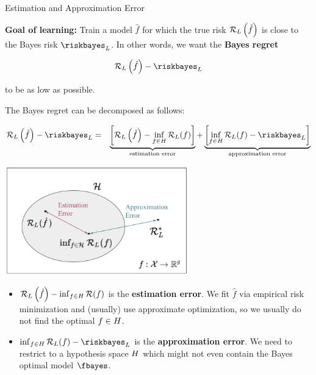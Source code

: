 \begin{vbframe}{Estimation and Approximation Error} 

\textbf{Goal of learning: } Train a model $\hat f$ for which the true risk $\mathcal{R}_L\left(\hat f\right)$ is close to the Bayes risk $\riskbayes_L$. In other words, we want the \textbf{Bayes regret}


$$
	\risk_L\left(\hat f\right) - \riskbayes_{L}
$$ 

to be as low as possible. 

\lz 

The Bayes regret can be decomposed as follows: 

\begin{eqnarray*}
	\risk_L\left(\hat f\right) - \riskbayes_{L} &=& \underbrace{\left[\risk_L\left(\hat f\right) - \inf_{f \in \Hspace} \risk_L(f)\right]}_{\text{estimation error}} + \underbrace{\left[\inf_{f \in \Hspace} \risk_L(f) - \riskbayes_{L}\right]}_{\text{approximation error}}
\end{eqnarray*}

\framebreak 


\begin{center}
\includegraphics[width=0.6\textwidth]{figure_man/risk_minimization_diagram.png}
\end{center}

\begin{itemize}
	\item $\mathcal{R}_L\left(\hat f\right) - \inf_{f \in H} \mathcal{R}(f)$ is the \textbf{estimation error}. We fit $\hat f$ via empirical risk minimization and (usually) use approximate optimization, so we usually do not find the optimal $f \in H$.
	\item $\inf_{f \in \Hspace} \risk_L(f) - \riskbayes_{L}$ is the \textbf{approximation error}. We need to restrict to a hypothesis space $H$ which might not even contain the Bayes optimal model $\fbayes$. 
\end{itemize}

\end{vbframe}

